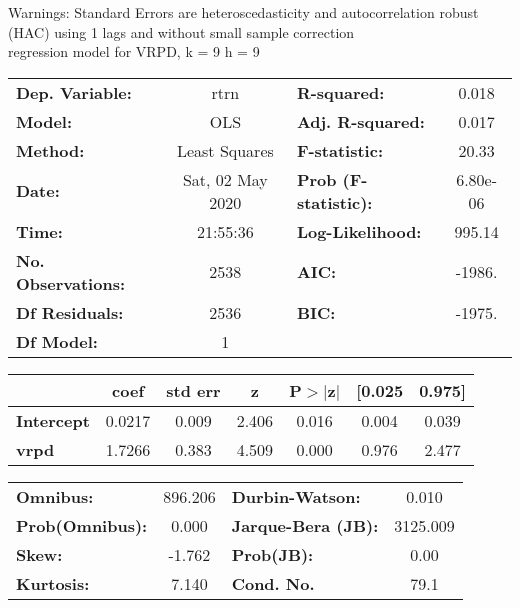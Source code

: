 Warnings: \newline
 [1] Standard Errors are heteroscedasticity and autocorrelation robust (HAC) using 1 lags and without small sample correction\\ 

regression model for VRPD, k = 9 h = 9\begin{center}
\begin{tabular}{lclc}
\toprule
\textbf{Dep. Variable:}    &       rtrn       & \textbf{  R-squared:         } &     0.018   \\
\textbf{Model:}            &       OLS        & \textbf{  Adj. R-squared:    } &     0.017   \\
\textbf{Method:}           &  Least Squares   & \textbf{  F-statistic:       } &     20.33   \\
\textbf{Date:}             & Sat, 02 May 2020 & \textbf{  Prob (F-statistic):} &  6.80e-06   \\
\textbf{Time:}             &     21:55:36     & \textbf{  Log-Likelihood:    } &    995.14   \\
\textbf{No. Observations:} &        2538      & \textbf{  AIC:               } &    -1986.   \\
\textbf{Df Residuals:}     &        2536      & \textbf{  BIC:               } &    -1975.   \\
\textbf{Df Model:}         &           1      & \textbf{                     } &             \\
\bottomrule
\end{tabular}
\begin{tabular}{lcccccc}
                   & \textbf{coef} & \textbf{std err} & \textbf{z} & \textbf{P$> |$z$|$} & \textbf{[0.025} & \textbf{0.975]}  \\
\midrule
\textbf{Intercept} &       0.0217  &        0.009     &     2.406  &         0.016        &        0.004    &        0.039     \\
\textbf{vrpd}      &       1.7266  &        0.383     &     4.509  &         0.000        &        0.976    &        2.477     \\
\bottomrule
\end{tabular}
\begin{tabular}{lclc}
\textbf{Omnibus:}       & 896.206 & \textbf{  Durbin-Watson:     } &    0.010  \\
\textbf{Prob(Omnibus):} &   0.000 & \textbf{  Jarque-Bera (JB):  } & 3125.009  \\
\textbf{Skew:}          &  -1.762 & \textbf{  Prob(JB):          } &     0.00  \\
\textbf{Kurtosis:}      &   7.140 & \textbf{  Cond. No.          } &     79.1  \\
\bottomrule
\end{tabular}
\end{center}

